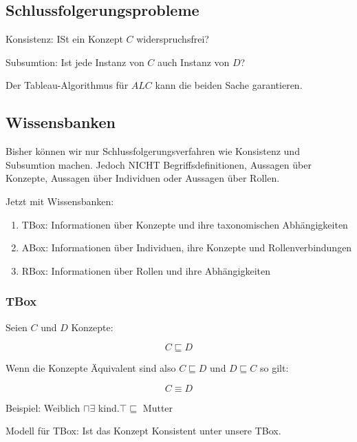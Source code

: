 \documentclass[a4paper]{article}
\begin{document}
\subsection{Schlussfolgerungsprobleme}

Konsistenz: ISt ein Konzept $C$ widerspruchsfrei?

Subsumtion: Ist jede Instanz von $C$ auch Instanz von $D$?

Der Tableau-Algorithmus für $ALC$ kann die beiden Sache garantieren.



\subsection{Wissensbanken}

Bisher können wir nur Schlussfolgerungsverfahren wie Konsistenz und Subsumtion machen. Jedoch NICHT Begriffsdefinitionen, Aussagen über Konzepte, Aussagen über Individuen oder Aussagen über Rollen.

Jetzt mit Wissensbanken: 

\begin{enumerate}
    \item TBox: Informationen über Konzepte und ihre taxonomischen Abhängigkeiten
    \item ABox: Informationen über Individuen, ihre Konzepte und Rollenverbindungen
    \item RBox: Informationen über Rollen und ihre Abhängigkeiten
\end{enumerate}

\subsubsection{TBox}

Seien $C$ und $D$ Konzepte:

\[
C \sqsubseteq D
\]

Wenn die Konzepte Äquivalent sind also $C \sqsubseteq D$ und $D \sqsubseteq C$ so gilt:

\[
C \equiv D
\]

Beispiel: Weiblich $\sqcap \exists$ kind.$\top \sqsubseteq$ Mutter

Modell für TBox: Ist das Konzept Konsistent unter unsere TBox.
\end{document}
